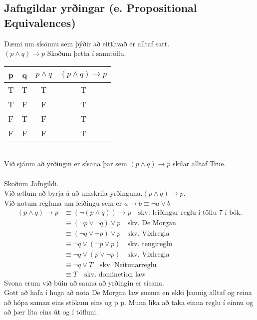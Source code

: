 \subsection{Jafngildar yrðingar (e. Propositional Equivalences)}
Dæmi um sísönnu sem þýðir að eitthvað er alltaf satt.\\
$(p \wedge q) \to p$ Skoðum þetta í sanntöflu.\\
\begin{tabular}{ c|c|c|c }
    p & q & $p \wedge q$ & $(p \wedge q) \to p$
    \\ \hline
    T & T & T & T 
    \\ \hline
    T & F & F & T
    \\ \hline
    F & T & F & T
    \\ \hline
    F & F & F & T
    \\ \hline
\end{tabular}
\\
Við sjáum að yrðingin er sísana þar sem $(p \wedge q) \to p$ skilar alltaf True.\\
\\ 
Skoðum Jafngildi.\\
Við ætlum að byrja á að umskrifa yrðinguna.$(p \wedge q) \to p$.\\
Við notum regluna um leiðingu sem er $a \to b \equiv \lnot a \vee b$
\begin{align*}
    (p \wedge q) \to p &\equiv (\lnot(p \wedge q)) \to p \quad \text{skv. leiðingar reglu í töflu 7 í bók.}\\
    &\equiv (\lnot p \vee \lnot q) \vee p \quad \text{skv. De Morgan}\\
    &\equiv (\lnot q \vee \lnot p) \vee p \quad \text{skv. Vixlregla}\\
    &\equiv \lnot q \vee (\lnot p \vee p) \quad \text{skv. tengireglu}\\
    &\equiv \lnot q \vee (p \vee \lnot p) \quad \text{skv. Vixlregla}\\
    &\equiv \lnot q \vee T \quad \text{skv. Neitunarreglu}\\
    &\equiv T \quad \text{skv. dominetion law}
\end{align*}
Svona erum við búin að sanna að yrðingin er sísana.\\
Gott að hafa í huga að nota De Morgan law snema en ekki þannig alltaf og reina að hópa saman eins stökum eins og p p. Muna líka að taka einna reglu í einnu og að þær líta eins út og í töfluni.\\
\newpage
